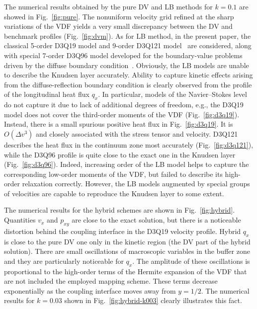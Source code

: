 \documentclass[]{elsarticle} %
\newcommand{\OO}[1]{O(#1)}
\begin{document}
The numerical results obtained by the pure DV and LB methods for \(k=0.1\) are showed in Fig.~\ref{fig:pure}.
The nonuniform velocity grid refined at the sharp variations of the VDF yields a very small discrepancy
between the DV and benchmark profiles (Fig.~\ref{fig:dvm}).
As for LB method, in the present paper, the classical 5-order D3Q19 model and 9-order D3Q121 model~\cite{Shan2010} are considered,
along with special 7-order D3Q96 model developed for the boundary-value problems driven by the diffuse boundary condition~\cite{Feuchter2016}.
Obviously, the LB models are unable to describe the Knudsen layer accurately.
Ability to capture kinetic effects arising from the diffuse-reflection boundary condition
is clearly observed from the profile of the longitudinal heat flux \(q_x\).
In particular, models of the Navier--Stokes level do not capture it due to lack of additional degrees of freedom,
e.g., the D3Q19 model does not cover the third-order moments of the VDF (Fig.~\ref{fig:d3q19}).
Instead, there is a small spurious positive heat flux in Fig.~\ref{fig:d3q19}.
It is \(\OO{\Delta v^3}\) and closely associated with the stress tensor and velocity.
D3Q121 describes the heat flux in the continuum zone most accurately (Fig.~\ref{fig:d3q121}),
while the D3Q96 profile is quite close to the exact one in the Knudsen layer (Fig.~\ref{fig:d3q96}).
Indeed, increasing order of the LB model helps to capture the corresponding low-order moments of the VDF,
but failed to describe its high-order relaxation correctly.
However, the LB models augmented by special groups of velocities are capable to reproduce the Knudsen layer to some extent.

The numerical results for the hybrid schemes are shown in Fig.~\ref{fig:hybrid}.
Quantities \(v_x\) and \(p_{xy}\) are close to the exact solution,
but there is a noticeable distortion behind the coupling interface in the D3Q19 velocity profile.
Hybrid \(q_x\) is close to the pure DV one only in the kinetic region (the DV part of the hybrid solution).
There are small oscillations of macroscopic variables in the buffer zone and they are particularly noticeable for \(q_x\).
The amplitude of these oscillations is proportional to the high-order terms of the Hermite expansion of the VDF
that are not included the employed mapping scheme.
These terms decrease exponentially as the coupling interface moves away from \(y=1/2\).
The numerical results for \(k=0.03\) shown in Fig.~\ref{fig:hybrid-k003} clearly illustrates this fact.
\end{document}

